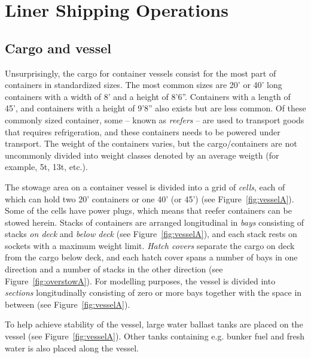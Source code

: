 \section{Liner Shipping Operations}
\subsection{Cargo and vessel}
Unsurprisingly, the cargo for container vessels consist for the most part of containers in standardized sizes. The most common sizes are 20' or 40' long containers with a width of 8' and a height of 8'6''. Containers with a length of 45', and containers with a height of 9'8'' also exists but are less common. Of these commonly sized container, some -- known as \emph{reefers} -- are used to transport goods that requires refrigeration, and these containers needs to be powered under transport.  The weight of the containers varies, but the cargo/containers are not uncommonly divided into weight classes denoted by an average weigth (for example, 5t, 13t, etc.).

The stowage area on a container vessel is divided into a grid of \emph{cells}, each of which can hold two 20' containers or one 40' (or 45') (see Figure~\ref{fig:vesselA}). Some of the cells have power plugs, which means that reefer containers can be stowed herein. 
Stacks of containers are arranged longitudinal in \emph{bays} consisting of stacks \emph{on deck} and \emph{below deck} (see Figure~\ref{fig:vesselA}), and each stack rests on sockets with a maximum weight limit. 
\emph{Hatch covers} separate the cargo on deck from the cargo below deck, and each hatch cover spans a number of bays in one direction and a number of stacks in the other direction (see Figure~\ref{fig:overstowA}).
For modelling purposes, the vessel is divided into \emph{sections} longitudinally consisting of zero or more bays together with the space in between (see Figure~\ref{fig:vesselA}). 

To help achieve stability of the vessel, large water ballast tanks are placed on the vessel (see Figure~\ref{fig:vesselA}). Other tanks containing e.g. bunker fuel and fresh water is also placed along the vessel.

